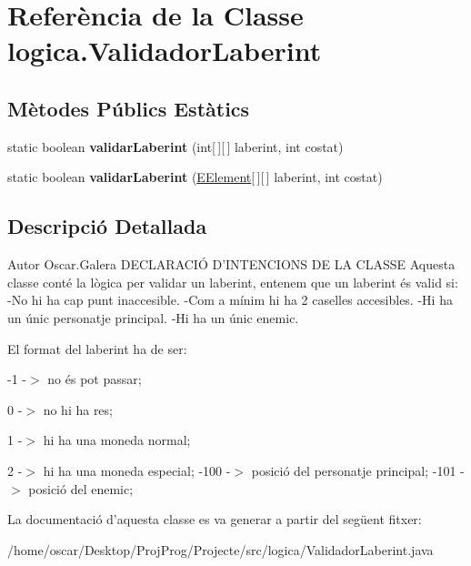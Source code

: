 \hypertarget{classlogica_1_1_validador_laberint}{\section{Referència de la Classe logica.\+Validador\+Laberint}
\label{classlogica_1_1_validador_laberint}
}
\subsection*{Mètodes Públics Estàtics}
\begin{DoxyCompactItemize}
\item 
\hypertarget{classlogica_1_1_validador_laberint_ae68bc2619d7584ee5706305220edf18f}{static boolean {\bfseries validar\+Laberint} (int\mbox{[}$\,$\mbox{]}\mbox{[}$\,$\mbox{]} laberint, int costat)}\label{classlogica_1_1_validador_laberint_ae68bc2619d7584ee5706305220edf18f}

\item 
\hypertarget{classlogica_1_1_validador_laberint_ab3c011bc020892b76d217106b2903bd4}{static boolean {\bfseries validar\+Laberint} (\hyperlink{enumlogica_1_1enumeracions_1_1_e_element}{E\+Element}\mbox{[}$\,$\mbox{]}\mbox{[}$\,$\mbox{]} laberint, int costat)}\label{classlogica_1_1_validador_laberint_ab3c011bc020892b76d217106b2903bd4}

\end{DoxyCompactItemize}


\subsection{Descripció Detallada}
\begin{DoxyAuthor}{Autor}
Oscar.\+Galera D\+E\+C\+L\+A\+R\+A\+C\+IÓ D'I\+N\+T\+E\+N\+C\+I\+O\+N\+S D\+E L\+A C\+L\+A\+S\+S\+E Aquesta classe conté la lògica per validar un laberint, entenem que un laberint és valid si\+: -\/\+No hi ha cap punt inaccesible. -\/\+Com a mínim hi ha 2 caselles accesibles. -\/\+Hi ha un únic personatje principal. -\/\+Hi ha un únic enemic.
\end{DoxyAuthor}
El format del laberint ha de ser\+:
\begin{DoxyItemize}
\item -\/1 -\/$>$ no és pot passar;
\item 0 -\/$>$ no hi ha res;
\item 1 -\/$>$ hi ha una moneda normal;
\item 2 -\/$>$ hi ha una moneda especial; -\/100 -\/$>$ posició del personatje principal; -\/101 -\/$>$ posició del enemic; 
\end{DoxyItemize}

La documentació d'aquesta classe es va generar a partir del següent fitxer\+:\begin{DoxyCompactItemize}
\item 
/home/oscar/\+Desktop/\+Proj\+Prog/\+Projecte/src/logica/Validador\+Laberint.\+java\end{DoxyCompactItemize}
